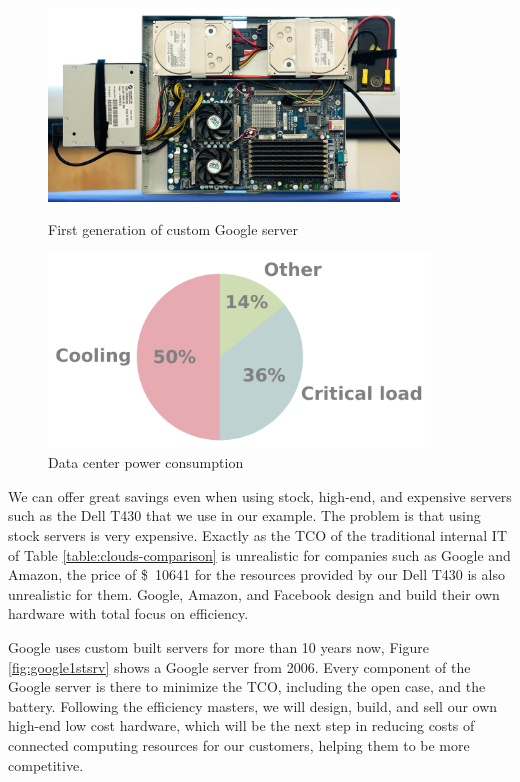\begin{figure}
    \centering
    \begin{minipage}{0.5\textwidth}
        \centering
        \includegraphics[width=0.83\textwidth]{images/GoogleServerLarge}
        \caption{First generation of custom Google server}
        \label{fig:google1stsrv}
    \end{minipage}%
    \begin{minipage}{0.5\textwidth}
        \centering
        \includegraphics[width=0.9\textwidth]{images/power-pie.pdf}
        \caption{Data center power consumption}
        \label{fig:power-bd}
    \end{minipage}%
\end{figure}

We can offer great savings even when using stock, high-end, and expensive
servers such as the Dell T430 \cite{T430} that we use in our example. The problem
is that using stock servers is very expensive. Exactly as the TCO of the
traditional internal IT of Table \ref{table:clouds-comparison} is unrealistic
for companies such as Google and Amazon, the price of \SI{10641}[\$]{} for the
resources provided by our Dell T430 is also unrealistic for them. Google,
Amazon, and Facebook design and build their own hardware with total focus on
efficiency.

Google uses custom built servers for more than 10 years now, Figure
\ref{fig:google1stsrv} \cite{cnetgsrv} shows a Google server from 2006. Every
component of the Google server is there to minimize the TCO, including the open
case, and the battery. Following the efficiency masters, we will design, build,
and sell our own high-end low cost hardware, which will be the next step in
reducing costs of connected computing resources for our customers, helping them
to be more competitive.

